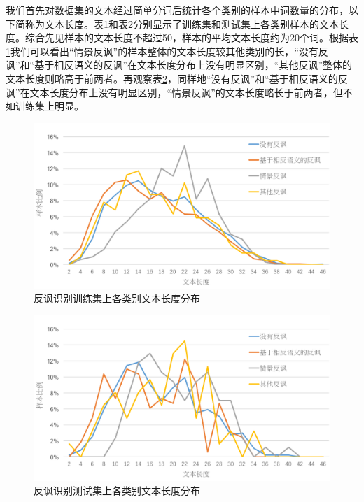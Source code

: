 我们首先对数据集的文本经过简单分词后统计各个类别的样本中词数量的分布，以下简称为文本长度。表\ref{fig:semeval2018_task3_train_class_len}和表\ref{fig:semeval2018_task3_test_class_len}分别显示了训练集和测试集上各类别样本的文本长度。综合先见样本的文本长度不超过50，样本的平均文本长度约为20个词。根据表\ref{fig:semeval2018_task3_train_class_len}我们可以看出“情景反讽”的样本整体的文本长度较其他类别的长，“没有反讽”和“基于相反语义的反讽”在文本长度分布上没有明显区别，“其他反讽”整体的文本长度则略高于前两者。再观察表\ref{fig:semeval2018_task3_test_class_len}，同样地“没有反讽”和“基于相反语义的反讽”在文本长度分布上没有明显区别，“情景反讽”的文本长度略长于前两者，但不如训练集上明显。

\begin{figure}[H]
  \centering
  \includegraphics[width=\textwidth]{img/semeval2018_task3_train_class_len.png}
  \caption{反讽识别训练集上各类别文本长度分布}
  \label{fig:semeval2018_task3_train_class_len}
\end{figure}

\begin{figure}[H]
  \centering
  \includegraphics[width=\textwidth]{img/semeval2018_task3_test_class_len.png}
  \caption{反讽识别测试集上各类别文本长度分布}
  \label{fig:semeval2018_task3_test_class_len}
\end{figure}


